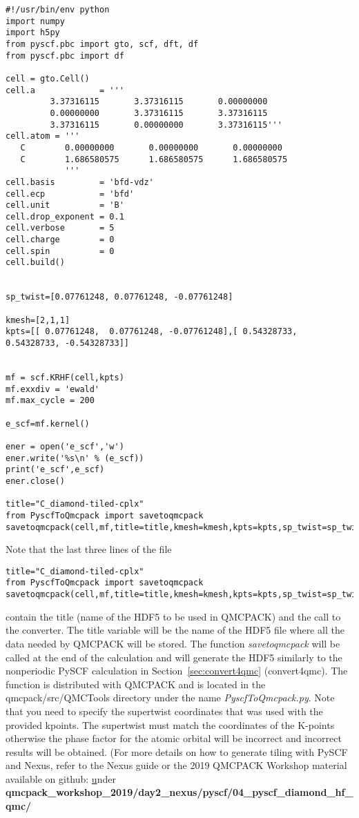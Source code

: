 \begin{lstlisting}[style=Python,caption=Example PySCF input for single k-point calculation for a $2 \times 1 \times 1$ carbon supercell.]
#!/usr/bin/env python
import numpy
import h5py
from pyscf.pbc import gto, scf, dft, df
from pyscf.pbc import df

cell = gto.Cell()
cell.a             = '''
         3.37316115       3.37316115       0.00000000
         0.00000000       3.37316115       3.37316115
         3.37316115       0.00000000       3.37316115'''
cell.atom = '''  
   C        0.00000000       0.00000000       0.00000000
   C        1.686580575      1.686580575      1.686580575 
            '''
cell.basis         = 'bfd-vdz'
cell.ecp           = 'bfd'
cell.unit          = 'B'
cell.drop_exponent = 0.1
cell.verbose       = 5
cell.charge        = 0
cell.spin          = 0
cell.build()


sp_twist=[0.07761248, 0.07761248, -0.07761248]

kmesh=[2,1,1]
kpts=[[ 0.07761248,  0.07761248, -0.07761248],[ 0.54328733,  0.54328733, -0.54328733]]


mf = scf.KRHF(cell,kpts)
mf.exxdiv = 'ewald'
mf.max_cycle = 200

e_scf=mf.kernel()

ener = open('e_scf','w')
ener.write('%s\n' % (e_scf))
print('e_scf',e_scf)
ener.close()

title="C_diamond-tiled-cplx"
from PyscfToQmcpack import savetoqmcpack
savetoqmcpack(cell,mf,title=title,kmesh=kmesh,kpts=kpts,sp_twist=sp_twist)

\end{lstlisting}

Note that the last three lines of the file
\begin{lstlisting}[style=Python]
title="C_diamond-tiled-cplx"
from PyscfToQmcpack import savetoqmcpack
savetoqmcpack(cell,mf,title=title,kmesh=kmesh,kpts=kpts,sp_twist=sp_twist)
\end{lstlisting}

contain the title (name of the HDF5 to be used in QMCPACK) and the call to the converter. The title variable will be the name of the
HDF5 file where all the data needed by QMCPACK will be stored.  The
function \textit{savetoqmcpack} will be called at the end of the
calculation and will generate the HDF5 similarly to the nonperiodic
PySCF calculation in Section~\ref{sec:convert4qmc} (convert4qmc). The
function is distributed with QMCPACK and is located in the
qmcpack/src/QMCTools directory under the name
\textit{PyscfToQmcpack.py}. Note that you need to specify the supertwist coordinates that was used with the provided kpoints. The supertwist must match the coordinates of the K-points otherwise the phase factor for the atomic orbital will be incorrect and incorrect results will be obtained. (For more details on how to generate tiling with PySCF and Nexus,  refer to the Nexus guide or the 2019 QMCPACK Workshop material available on github: \href{https://github.com/QMCPACK/qmcpack_workshop_2019} under \textbf{qmcpack_workshop_2019/day2_nexus/pyscf/04_pyscf_diamond_hf_qmc/}


